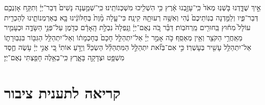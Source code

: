 \documentclass[twoside, openany, parskip=half, 11pt]{book}
\begin{document}
\begin{footnotesize}
\begin{multicols}{2}
אֵ֣יךְ שֻׁדָּ֑דְנוּ בֹּ֤שְׁנֽוּ מְאֹד֙ כִּֽי־עָזַ֣בְנוּ אָ֔רֶץ כִּ֥י הִשְׁלִ֖יכוּ מִשְׁכְּנוֹתֵֽינוּ׃ כִּֽי־שְׁמַ֤עְנָה נָשִׁים֙ דְּבַר־יְיָ֔ וְתִקַּ֥ח אָזְנְכֶ֖ם דְּבַר־פִּ֑יו וְלַמֵּ֤דְנָה בְנֽוֹתֵיכֶם֙ נֶ֔הִי וְאִשָּׁ֥ה רְעוּתָ֖הּ קִינָֽה׃ כִּי־עָ֤לָה מָ֨וֶת֙ בְּחַלּוֹנֵ֔ינוּ בָּ֖א בְּאַרְמְנוֹתֵ֑ינוּ לְהַכְרִ֤ית עוֹלָל֙ מִח֔וּץ בַּֽחוּרִ֖ים מֵֽרְחֹבֽוֹת׃ דַּבֵּ֗ר כֹּ֚ה נְאֻם־יְיָ֔ וְנָֽפְלָה֙ נִבְלַ֣ת הָֽאָדָ֔ם כְּדֹ֖מֶן עַל־פְּנֵ֣י הַשָּׂדֶ֑ה וּכְעָמִ֛יר מֵאַֽחֲרֵ֥י הַקֹּצֵ֖ר וְאֵ֥ין מְאַסֵּֽף׃ כֹּ֣ה אָמַ֣ר יְיָ֗ אַל־יִתְהַלֵּ֤ל חָכָם֙ בְּחָכְמָת֔וֹ וְאַל־יִתְהַלֵּ֥ל הַגִּבּ֖וֹר בִּגְבֽוּרָת֑וֹ אַל־יִתְהַלֵּ֥ל עָשִׁ֖יר בְּעָשְׁרֽוֹ׃ כִּ֣י אִם־בְּזֹ֞את יִתְהַלֵּ֣ל הַמִּתְהַלֵּ֗ל הַשְׂכֵּל֘ וְיָדֹ֣עַ אוֹתִי֒ כִּ֚י אֲנִ֣י יְיָ֔ עֹ֥שֶׂה חֶ֛סֶד מִשְׁפָּ֥ט וּצְדָקָ֖ה בָּאָ֑רֶץ כִּֽי־בְאֵ֥לֶּה חָפַ֖צְתִּי נְאֻם־יְיָ׃

\end{multicols}

\section[תענית ציבור]{קריאה לתענית ציבור}\label{torah taanis tzibbur}
 
 \begin{multicols}{2}
 

\end{multicols}
\end{footnotesize}
\end{document}
